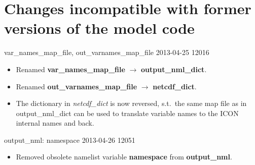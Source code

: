 %

\section{Changes incompatible with former versions of the model code}\label{sec:changes}
\noindent
%

\begin{changeitem}{ var\_names\_map\_file, out\_varnames\_map\_file }{ 2013-04-25 }{ 12016 }
  \begin{itemize}
   \item Renamed \textbf{var\_names\_map\_file} $\rightarrow$ \textbf{output\_nml\_dict}.
   \item Renamed \textbf{out\_varnames\_map\_file} $\rightarrow$ \textbf{netcdf\_dict}.
   \item The dictionary in \emph{netcdf\_dict} is now reversed, s.t.\ the same map file
         as in output\_nml\_dict can be used to translate variable names to the ICON internal
         names and back.
  \end{itemize}
\end{changeitem}


\begin{changeitem}{output\_nml: namespace}{ 2013-04-26 }{ 12051 }
  \begin{itemize}
   \item Removed obsolete namelist variable \textbf{namespace} from \textbf{output\_nml}.
  \end{itemize}
\end{changeitem}

